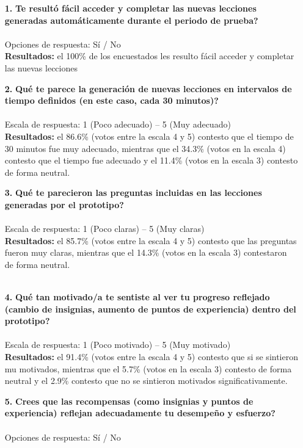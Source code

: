 \begin{enumerate}
\item[\textbf{1.}] \textbf{\textquestiondown Te resultó fácil acceder y completar las nuevas lecciones generadas automáticamente durante el periodo de prueba?}\\\\
Opciones de respuesta: Sí / No\\

\textbf{Resultados: } el 100\% de los encuestados les resulto fácil acceder y completar las nuevas lecciones
\\
\item[\textbf{2.}] \textbf{\textquestiondown Qué te parece la generación de nuevas lecciones en intervalos de tiempo definidos (en este caso, cada 30 minutos)?} \\\\
Escala de respuesta: 1 (Poco adecuado) -- 5 (Muy adecuado)\\

\textbf{Resultados: } el 86.6\% (votos entre la escala 4 y 5) contesto que el tiempo de 30 minutos fue muy adecuado, mientras que el 34.3\% (votos en la escala 4) contesto que el tiempo fue adecuado y el 11.4\% (votos en la escala 3) contesto de forma neutral.
\\
\item[\textbf{3.}] \textbf{\textquestiondown Qué te parecieron las preguntas incluidas en las lecciones generadas por el prototipo?}\\\\
Escala de respuesta: 1 (Poco claras) -- 5 (Muy claras)\\

\textbf{Resultados: } el 85.7\% (votos entre la escala 4 y 5) contesto que las preguntas fueron muy claras, mientras que el 14.3\% (votos en la escala 3) contestaron de forma neutral.
\\
\\
\item[\textbf{4.}] \textbf{\textquestiondown Qué tan motivado/a te sentiste al ver tu progreso reflejado (cambio de insignias, aumento de puntos de experiencia) dentro del prototipo?}\\\\
Escala de respuesta: 1 (Poco motivado) -- 5 (Muy motivado)\\


\textbf{Resultados: } el 91.4\% (votos entre la escala 4 y 5) contesto que si se sintieron mu motivados, mientras que el 5.7\% (votos en la escala 3) contesto de forma neutral y el 2.9\% contesto que no se sintieron motivados significativamente.
\\
\item[\textbf{5.}] \textbf{\textquestiondown Crees que las recompensas (como insignias y puntos de experiencia) reflejan adecuadamente tu desempeño y esfuerzo?} \\\\
Opciones de respuesta: S\'i / No\\


\end{enumerate}
